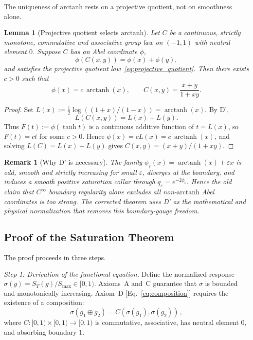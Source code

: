 \documentclass[aps,prd,twocolumn,superscriptaddress,nofootinbib]{revtex4-2}
\newtheorem{lemma}{Lemma}
\newtheorem{remark}{Remark}
\begin{document}
The uniqueness of $\mathrm{arctanh}$ rests on a projective quotient, not on smoothness alone.

\begin{lemma}[Projective quotient selects $\mathrm{arctanh}$]\label{lem:projective_arctanh}
Let $C$ be a continuous, strictly monotone, commutative and associative group law on $(-1,1)$ with neutral element $0$. Suppose $C$ has an Abel coordinate $\phi$,
\[
  \phi(C(x,y))=\phi(x)+\phi(y),
\]
and satisfies the projective quotient law~\eqref{eq:projective_quotient}. Then there exists $c>0$ such that
\[
  \phi(x)=c\,\operatorname{arctanh}(x),
  \qquad
  C(x,y)=\frac{x+y}{1+xy}.
\]
\end{lemma}

\begin{proof}
Set $L(x):=\frac12\log((1+x)/(1-x))=\operatorname{arctanh}(x)$. By D',
\[
  L(C(x,y))=L(x)+L(y).
\]
Thus $F(t):=\phi(\tanh t)$ is a continuous additive function of $t=L(x)$, so $F(t)=ct$ for some $c>0$. Hence $\phi(x)=cL(x)=c\,\operatorname{arctanh}(x)$, and solving $L(C)=L(x)+L(y)$ gives $C(x,y)=(x+y)/(1+xy)$.
\end{proof}

\begin{remark}[Why D' is necessary]
The family $\phi_\varepsilon(x)=\operatorname{arctanh}(x)+\varepsilon x$ is odd, smooth and strictly increasing for small $\varepsilon$, diverges at the boundary, and induces a smooth positive saturation collar through $q_\varepsilon=e^{-2\phi_\varepsilon}$. Hence the old claim that $C^\infty$ boundary regularity alone excludes all non-$\mathrm{arctanh}$ Abel coordinates is too strong. The corrected theorem uses D' as the mathematical and physical normalization that removes this boundary-gauge freedom.
\end{remark}

\subsection{Proof of the Saturation Theorem}

The proof proceeds in three steps.

\textit{Step 1: Derivation of the functional equation.}
Define the normalized response $\sigma(g) = S_T(g)/S_{\max} \in [0, 1)$. Axioms~A and~C guarantee that $\sigma$ is bounded and monotonically increasing. Axiom~D [Eq.~\eqref{eq:composition}] requires the existence of a composition:
\begin{equation}
\sigma(g_1 \oplus g_2) = C(\sigma(g_1), \sigma(g_2))\,,
\label{eq:normalized_composition}
\end{equation}
where $C: [0,1) \times [0,1) \to [0,1)$ is commutative, associative, has neutral element $0$, and absorbing boundary $1$.
\end{document}
